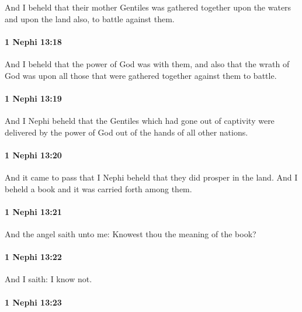 			And I beheld that their mother Gentiles was gathered together
			upon the waters and upon the land also,
			to battle against them.

		\paragraph{1 Nephi 13:18} %
			\label{1NEPHI-13-18}

			And I beheld that the power of God was with them,
			and also that the wrath of God was upon all those
			that were gathered together against them to battle.

		\paragraph{1 Nephi 13:19} %
			\label{1NEPHI-13-19}

			And I Nephi beheld that the Gentiles which had gone out of captivity
			were delivered by the power of God out of the hands of all other nations.

		\paragraph{1 Nephi 13:20} %
			\label{1NEPHI-13-20}

			And it came to pass that I Nephi beheld that they did prosper in the land.
			And I beheld a book and it was carried forth among them.

		\paragraph{1 Nephi 13:21} %
			\label{1NEPHI-13-21}

			And the angel saith unto me:
			Knowest thou the meaning of the book?

		\paragraph{1 Nephi 13:22} %
			\label{1NEPHI-13-22}

			And I saith:
			I know not.

		\paragraph{1 Nephi 13:23} %
			\label{1NEPHI-13-23}

